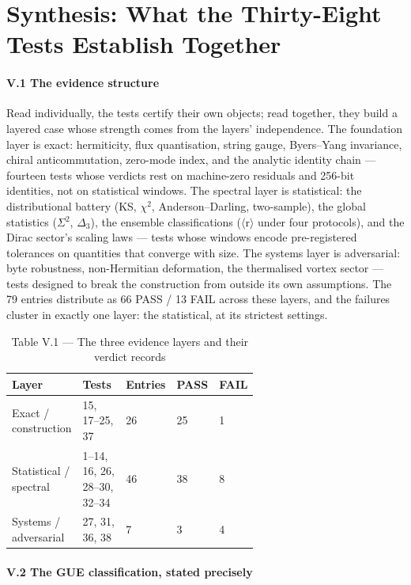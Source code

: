 \documentclass[10pt]{article}
\begin{document}
\section{Synthesis: What the Thirty-Eight Tests Establish Together}

\paragraph{V.1 The evidence structure}

Read individually, the tests certify their own objects; read together, they build a layered case whose strength comes from the layers' independence. The foundation layer is exact: hermiticity, flux quantisation, string gauge, Byers--Yang invariance, chiral anticommutation, zero-mode index, and the analytic identity chain --- fourteen tests whose verdicts rest on machine-zero residuals and 256-bit identities, not on statistical windows. The spectral layer is statistical: the distributional battery (KS, $\chi$$^2$, Anderson--Darling, two-sample), the global statistics ($\Sigma$$^2$, $\Delta$$_3$), the ensemble classifications ($\langle$r$\rangle$ under four protocols), and the Dirac sector's scaling laws --- tests whose windows encode pre-registered tolerances on quantities that converge with size. The systems layer is adversarial: byte robustness, non-Hermitian deformation, the thermalised vortex sector --- tests designed to break the construction from outside its own assumptions. The 79 entries distribute as 66 PASS / 13 FAIL across these layers, and the failures cluster in exactly one layer: the statistical, at its strictest settings.

\begin{table}[htbp]
\centering
\small
\caption{Table V.1 --- The three evidence layers and their verdict records}
\begin{tabular}{lp{0.62\linewidth}lll}
\toprule
\textbf{Layer} & \textbf{Tests} & \textbf{Entries} & \textbf{PASS} & \textbf{FAIL} \\
\midrule
Exact / construction & 15, 17--25, 37 & 26 & 25 & 1 \\
Statistical / spectral & 1--14, 16, 26, 28--30, 32--34 & 46 & 38 & 8 \\
Systems / adversarial & 27, 31, 36, 38 & 7 & 3 & 4 \\
\bottomrule
\end{tabular}
\end{table}

\paragraph{V.2 The GUE classification, stated precisely}
\end{document}
